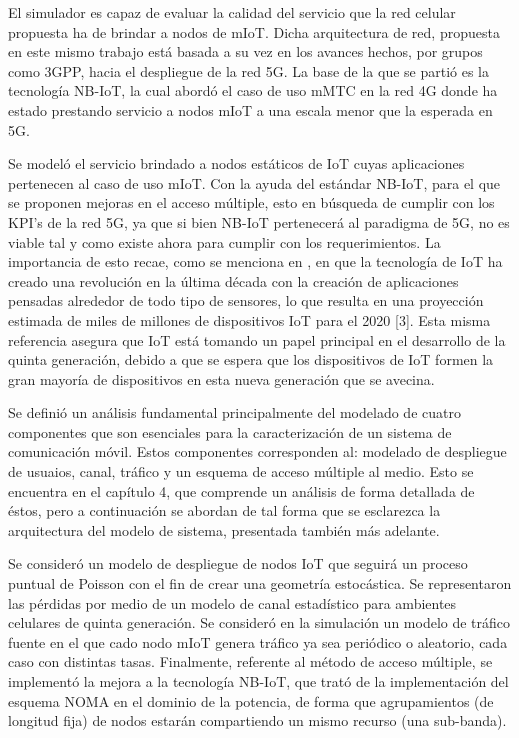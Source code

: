 El simulador es capaz de evaluar la calidad del servicio que la red celular propuesta ha de brindar a nodos de mIoT. Dicha arquitectura de red, propuesta en este mismo trabajo está basada a su vez en los avances hechos, por grupos como 3GPP, hacia el despliegue de la red 5G. La base de la que se partió es la tecnología NB-IoT, la cual abordó el caso de uso mMTC en la red 4G donde ha estado prestando servicio a nodos mIoT a una escala menor que la esperada en 5G.\newline

Se modeló el servicio brindado a nodos estáticos de IoT cuyas aplicaciones pertenecen al caso de uso mIoT. Con la ayuda del estándar NB-IoT, para el que se proponen mejoras en el acceso múltiple, esto en búsqueda de cumplir con los KPI’s de la red 5G, ya que si bien NB-IoT pertenecerá al paradigma de 5G, no es viable tal y como existe ahora para cumplir con los requerimientos. La importancia de esto recae, como se menciona en \parencite{EjazIoT}, en que la tecnología de IoT ha creado una revolución en la última década con la creación de aplicaciones pensadas alrededor de todo tipo de sensores, lo que resulta en una proyección estimada de miles de millones de dispositivos IoT para el 2020 [3]. Esta misma referencia asegura que IoT está tomando un papel principal en el desarrollo de la quinta generación, debido a que se espera que los dispositivos de IoT formen la gran mayoría de dispositivos en esta nueva generación que se avecina.\newline

Se definió un análisis fundamental principalmente del modelado de cuatro componentes que son esenciales para la caracterización de un sistema de comunicación móvil. Estos componentes corresponden al: modelado de despliegue de usuaios, canal, tráfico y un esquema de acceso múltiple al medio. Esto se encuentra en el capítulo 4, que comprende un análisis de forma detallada de éstos, pero a continuación se abordan de tal forma que se esclarezca la arquitectura del modelo de sistema, presentada también más adelante.\newline

Se consideró un modelo de despliegue de nodos IoT que seguirá un proceso puntual de Poisson con el fin de crear una geometría estocástica. Se representaron las pérdidas por medio de un modelo de canal estadístico para ambientes celulares de quinta generación. Se consideró en la simulación un modelo de tráfico fuente en el que cado nodo mIoT genera tráfico ya sea periódico o aleatorio, cada caso con distintas tasas. Finalmente, referente al método de acceso múltiple, se implementó la mejora a la tecnología NB-IoT, que trató de la implementación del esquema NOMA en el dominio de la potencia, de forma que agrupamientos (de longitud fija) de nodos estarán compartiendo un mismo recurso (una sub-banda).\newline

